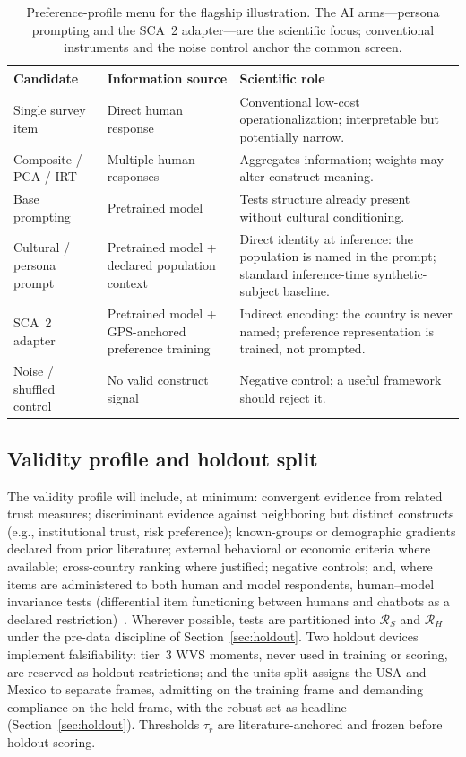 \documentclass[10pt,letterpaper]{article}
\newcommand{\Rset}{\mathcal{R}}
\begin{document}
\begin{table}[t]
\centering
\small
\caption{Preference-profile menu for the flagship illustration.
The AI arms---persona prompting and the SCA~2 adapter---are the scientific focus; conventional instruments and the noise control anchor the common screen.}
\label{tab:trustmenu}
\begin{tabularx}{\textwidth}{@{}>{\raggedright\arraybackslash}p{2.6cm} >{\raggedright\arraybackslash}p{3.4cm} X@{}}
\toprule
\textbf{Candidate} & \textbf{Information source} & \textbf{Scientific role} \\
\midrule
Single survey item & Direct human response & Conventional low-cost operationalization; interpretable but potentially narrow. \\
Composite / PCA / IRT & Multiple human responses & Aggregates information; weights may alter construct meaning. \\
Base prompting & Pretrained model & Tests structure already present without cultural conditioning. \\
Cultural / persona prompt & Pretrained model + declared population context & Direct identity at inference: the population is named in the prompt; standard inference-time synthetic-subject baseline. \\
SCA~2 adapter & Pretrained model + GPS-anchored preference training & Indirect encoding: the country is never named; preference representation is trained, not prompted. \\
Noise / shuffled control & No valid construct signal & Negative control; a useful framework should reject it. \\
\bottomrule
\end{tabularx}
\end{table}

\subsection{Validity profile and holdout split}
The validity profile will include, at minimum:
convergent evidence from related trust measures;
discriminant evidence against neighboring but distinct constructs (e.g., institutional trust, risk preference);
known-groups or demographic gradients declared from prior literature;
external behavioral or economic criteria where available;
cross-country ranking where justified;
negative controls;
and, where items are administered to both human and model respondents, human--model invariance tests (differential item functioning between humans and chatbots as a declared restriction)~\cite{zeinfeld2026}.
Wherever possible, tests are partitioned into $\Rset_S$ and $\Rset_H$ under the pre-data discipline of Section~\ref{sec:holdout}.
Two holdout devices implement falsifiability: tier~3 WVS moments, never used in training or scoring, are reserved as holdout restrictions; and the units-split assigns the USA and Mexico to separate frames, admitting on the training frame and demanding compliance on the held frame, with the robust set as headline (Section~\ref{sec:holdout}).
Thresholds $\tau_r$ are literature-anchored and frozen before holdout scoring.
\end{document}
